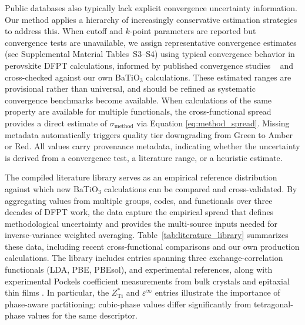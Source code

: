 \documentclass[prb,twocolumn,superscriptaddress,amsmath,amssymb,longbibliography]{revtex4-2}
\newcommand{\meth}{\mathrm{method}}
\begin{document}

Public databases also typically lack explicit convergence uncertainty information. Our method applies a hierarchy of increasingly conservative estimation strategies to address this. When cutoff and $k$-point parameters are reported but convergence tests are unavailable, we assign representative convergence estimates (see Supplemental Material Tables~S3--S4) using typical convergence behavior in perovskite DFPT calculations, informed by published convergence studies ~\cite{Ghosez1999,Wahl2008} and cross-checked against our own BaTiO$_3$ calculations. 
These estimated ranges are provisional rather than universal, and should be refined as systematic convergence benchmarks become available. 
When calculations of the same property are available for multiple functionals, the cross-functional spread provides a direct estimate of $\sigma_\meth$ via Equation \ref{eq:method_spread}. Missing metadata automatically triggers quality tier downgrading from Green to Amber or Red.
All values carry provenance metadata, indicating whether the uncertainty is derived from a convergence test, a literature range, or a heuristic estimate.


The compiled literature library serves as an empirical reference distribution against which  
new BaTiO$_3$ calculations can be compared and cross-validated. 
By aggregating values from 
multiple groups, codes, and functionals over three decades of DFPT work, the data 
capture the empirical spread that defines methodological uncertainty and 
provides the multi-source inputs needed for inverse-variance weighted 
averaging. Table~\ref{tab:literature_library} summarizes  these data, including recent 
cross-functional comparisons \cite{Amounas2024,Inerbaev2025} and our own 
production calculations. The library includes entries 
spanning three  
exchange-correlation functionals (LDA, PBE, PBEsol),
and experimental 
references, along with experimental Pockels coefficient measurements from 
bulk crystals and epitaxial thin 
films \cite{Reynaud2025,Suceava2025,Ghosez1998_BEC,Zhong1994_BTO,Veithen2005,Kwei1993,Hewat1973}. In particular, the  $Z^*_{\mathrm{Ti}}$ and $\varepsilon^\infty$ entries illustrate the 
importance of phase-aware partitioning: cubic-phase values differ significantly 
from tetragonal-phase values for the same descriptor.
\end{document}

